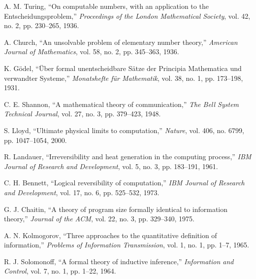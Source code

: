 \documentclass[12pt,a4paper]{article}
\begin{document}
\begin{thebibliography}{99}

 A. M. Turing, ``On computable numbers, with an application to the Entscheidungsproblem,'' \textit{Proceedings of the London Mathematical Society}, vol. 42, no. 2, pp. 230--265, 1936.

 A. Church, ``An unsolvable problem of elementary number theory,'' \textit{American Journal of Mathematics}, vol. 58, no. 2, pp. 345--363, 1936.

 K. Gödel, ``Über formal unentscheidbare Sätze der Principia Mathematica und verwandter Systeme,'' \textit{Monatshefte für Mathematik}, vol. 38, no. 1, pp. 173--198, 1931.

 C. E. Shannon, ``A mathematical theory of communication,'' \textit{The Bell System Technical Journal}, vol. 27, no. 3, pp. 379--423, 1948.

 S. Lloyd, ``Ultimate physical limits to computation,'' \textit{Nature}, vol. 406, no. 6799, pp. 1047--1054, 2000.

 R. Landauer, ``Irreversibility and heat generation in the computing process,'' \textit{IBM Journal of Research and Development}, vol. 5, no. 3, pp. 183--191, 1961.

 C. H. Bennett, ``Logical reversibility of computation,'' \textit{IBM Journal of Research and Development}, vol. 17, no. 6, pp. 525--532, 1973.

 G. J. Chaitin, ``A theory of program size formally identical to information theory,'' \textit{Journal of the ACM}, vol. 22, no. 3, pp. 329--340, 1975.

 A. N. Kolmogorov, ``Three approaches to the quantitative definition of information,'' \textit{Problems of Information Transmission}, vol. 1, no. 1, pp. 1--7, 1965.

 R. J. Solomonoff, ``A formal theory of inductive inference,'' \textit{Information and Control}, vol. 7, no. 1, pp. 1--22, 1964.

\end{thebibliography}
\end{document}
